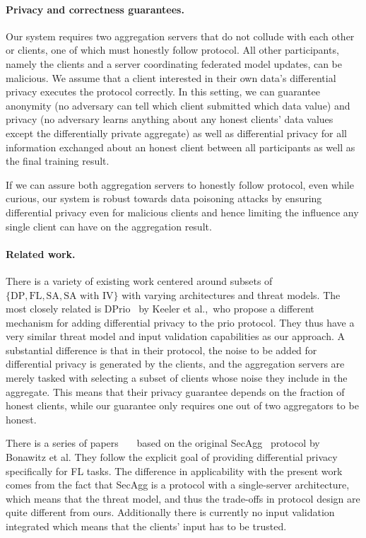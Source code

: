 \documentclass{article}
\begin{document}
\paragraph{Privacy and correctness guarantees.}
Our system requires two aggregation servers that do not collude with each other or clients, one of which must honestly follow protocol. All other participants, namely the clients and a server coordinating federated model updates, can be malicious. We assume that a client interested in their own data's differential privacy executes the protocol correctly. In this setting, we can guarantee anonymity (no adversary can tell which client submitted which data value) and privacy (no adversary learns anything about any honest clients' data values except the differentially private aggregate) as well as differential privacy for all information exchanged about an honest client between all participants as well as the final training result.

If we can assure both aggregation servers to honestly follow protocol, even while curious, our system is robust towards data poisoning attacks by ensuring differential privacy even for malicious clients and hence limiting the influence any single client can have on the aggregation result.

\paragraph{Related work.}
There is a variety of existing work centered around subsets of
$\{\textrm{DP}, \textrm{FL}, \textrm{SA}, \textrm{SA with IV}\}$ with varying
architectures and threat models. The most closely related is
DPrio~\cite{dprio} by Keeler et al.,\ who propose a different mechanism for
adding differential privacy to the prio protocol. They thus have a very similar
threat model and input validation capabilities as our approach. A substantial
difference is that in their protocol, the noise to be added for differential
privacy is generated by the clients, and the aggregation servers are merely
tasked with selecting a subset of clients whose noise they include in the
aggregate. This means that their privacy guarantee depends on the fraction of
honest clients, while our guarantee only requires one out of two aggregators to
be honest.

There is a series of papers~\cite{Kairouz2021TheDD}~\cite{}~\cite{} based on the original
SecAgg~\cite{secagg} protocol by Bonawitz et al. They follow the explicit goal
of providing differential privacy specifically for FL tasks.
The difference in applicability with the present work comes from the fact that SecAgg is a protocol
with a single-server architecture, which means that the threat model, and thus
the trade-offs in protocol design are quite different from ours. Additionally
there is currently no input validation integrated which means that the clients'
input has to be trusted.
\end{document}
